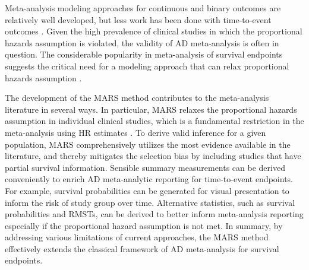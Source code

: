 \documentclass[12pt]{article}
\theoremstyle{mystyle}
\begin{document}
Meta-analysis modeling approaches for continuous and binary outcomes are relatively well developed, but less work has been done with time‐to‐event outcomes \citep{Freeman2017}.   Given the high prevalence of clinical studies in which the proportional hazards assumption is violated, the validity of AD meta-analysis is often in question.  The considerable popularity in meta-analysis of survival endpoints suggests the critical need for a modeling approach that can relax proportional hazards assumption \citep{Rulli2018}.  

The development of the MARS method contributes to the meta-analysis literature in several ways. %
In particular, MARS relaxes the proportional hazards assumption in individual clinical studies, which is a fundamental restriction in the meta-analysis using HR estimates \citep{Higgins2020}.
To derive valid inference for a given population, MARS comprehensively utilizes the most evidence available in the literature, and thereby mitigates the selection bias by including studies that have partial survival information.
Sensible summary measurements can be derived conveniently to enrich AD meta-analytic reporting for time-to-event endpoints. For example, survival probabilities can be generated for visual presentation to inform the risk of study group over time. Alternative statistics, such as survival probabilities and RMSTs, can be derived to better inform meta-analysis reporting especially if the proportional hazard assumption is not met. 
In summary, by addressing various limitations of current approaches, the MARS method effectively extends the classical framework of AD meta-analysis for survival endpoints.

\end{document}
